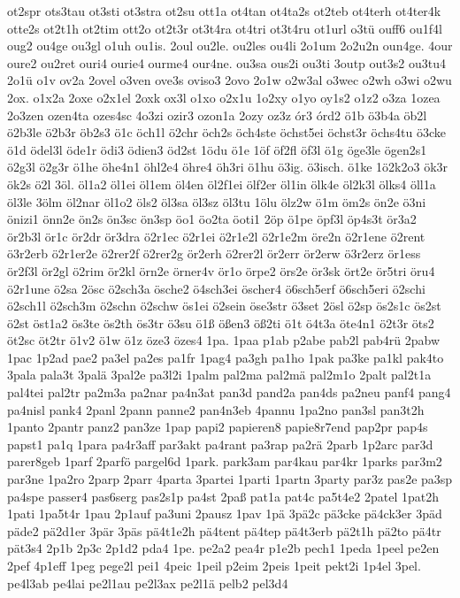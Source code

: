 {ot2spr
ots3tau
ot3sti
ot3stra
ot2su
ott1a
ot4tan
ot4ta2s
ot2teb
ot4terh
ot4ter4k
otte2s
ot2t1h
ot2tim
ott2o
ot2t3r
ot3t4ra
ot4tri
ot3t4ru
ot1url
o3tü
ouff6
ou1f4l
oug2
ou4ge
ou3gl
o1uh
ou1is.
2oul
ou2le.
ou2les
ou4li
2o1um
2o2u2n
oun4ge.
4our
oure2
ou2ret
ouri4
ourie4
ourme4
our4ne.
ou3sa
ous2i
ou3ti
3outp
out3s2
ou3tu4
2o1ü
o1v
ov2a
2ovel
o3ven
ove3s
oviso3
2ovo
2o1w
o2w3al
o3wec
o2wh
o3wi
o2wu
2ox.
o1x2a
2oxe
o2x1el
2oxk
ox3l
o1xo
o2x1u
1o2xy
o1yo
oy1s2
o1z2
o3za
1ozea
2o3zen
ozen4ta
ozes4sc
4o3zi
ozir3
ozon1a
2ozy
oz3z
ór3
órd2
ö1b
ö3b4a
öb2l
ö2b3le
ö2b3r
öb2s3
ö1c
öch1l
ö2chr
öch2s
öch4ste
öchst5ei
öchst3r
öchs4tu
ö3cke
ö1d
ödel3l
öde1r
ödi3
ödien3
öd2st
1ödu
ö1e
1öf
öf2fl
öf3l
ö1g
öge3le
ögen2s1
ö2g3l
ö2g3r
ö1he
öhe4n1
öhl2e4
öhre4
öh3ri
ö1hu
ö3ig.
ö3isch.
ö1ke
1ö2k2o3
ök3r
ök2s
ö2l
3öl.
öl1a2
öl1ei
öl1em
öl4en
öl2f1ei
ölf2er
öl1in
ölk4e
öl2k3l
ölks4
öll1a
öl3le
3ölm
öl2nar
öl1o2
öls2
öl3sa
öl3sz
öl3tu
1ölu
ölz2w
ö1m
öm2s
ön2e
ö3ni
önizi1
önn2e
ön2s
ön3sc
ön3sp
öo1
öo2ta
öoti1
2öp
ö1pe
öpf3l
öp4s3t
ör3a2
ör2b3l
ör1c
ör2dr
ör3dra
ö2r1ec
ö2r1ei
ö2r1e2l
ö2r1e2m
öre2n
ö2r1ene
ö2rent
ö3r2erb
ö2r1er2e
ö2rer2f
ö2rer2g
ör2erh
ö2rer2l
ör2err
ör2erw
ö3r2erz
ör1ess
ör2f3l
ör2gl
ö2rim
ör2kl
örn2e
örner4v
ör1o
örpe2
örs2e
ör3sk
ört2e
ör5tri
öru4
ö2r1une
ö2sa
2ösc
ö2sch3a
ösche2
ö4sch3ei
öscher4
ö6sch5erf
ö6sch5eri
ö2schi
ö2sch1l
ö2sch3m
ö2schn
ö2schw
ös1ei
ö2sein
öse3str
ö3set
2ösl
ö2sp
ös2s1c
ös2st
ö2st
öst1a2
ös3te
ös2th
ös3tr
ö3su
ö1ß
ößen3
öß2ti
ö1t
ö4t3a
öte4n1
ö2t3r
öts2
öt2sc
öt2tr
ö1v2
ö1w
ö1z
öze3
özes4
1pa.
1paa
p1ab
p2abe
pab2l
pab4rü
2pabw
1pac
1p2ad
pae2
pa3el
pa2es
pa1fr
1pag4
pa3gh
pa1ho
1pak
pa3ke
pa1kl
pak4to
3pala
pala3t
3palä
3pal2e
pa3l2i
1palm
pal2ma
pal2mä
pal2m1o
2palt
pal2t1a
pal4tei
pal2tr
pa2m3a
pa2nar
pa4n3at
pan3d
pand2a
pan4ds
pa2neu
panf4
pang4
pa4nisl
pank4
2panl
2pann
panne2
pan4n3eb
4pannu
1pa2no
pan3sl
pan3t2h
1panto
2pantr
panz2
pan3ze
1pap
papi2
papieren8
papie8r7end
pap2pr
pap4s
papst1
pa1q
1para
pa4r3aff
par3akt
pa4rant
pa3rap
pa2rä
2parb
1p2arc
par3d
parer8geb
1parf
2parfö
pargel6d
1park.
park3am
par4kau
par4kr
1parks
par3m2
par3ne
1pa2ro
2parp
2parr
4parta
3partei
1parti
1partn
3party
par3z
pas2e
pa3sp
pa4spe
passer4
pas6serg
pas2s1p
pa4st
2paß
pat1a
pat4c
pa5t4e2
2patel
1pat2h
1pati
1pa5t4r
1pau
2p1auf
pa3uni
2pausz
1pav
1pä
3pä2c
pä3cke
pä4ck3er
3päd
päde2
pä2d1er
3pär
3päs
pä4t1e2h
pä4tent
pä4tep
pä4t3erb
pä2t1h
pä2to
pä4tr
pät3s4
2p1b
2p3c
2p1d2
pda4
1pe.
pe2a2
pea4r
p1e2b
pech1
1peda
1peel
pe2en
2pef
4p1eff
1peg
pege2l
pei1
4peic
1peil
p2eim
2peis
1peit
pekt2i
1p4el
3pel.
pe4l3ab
pe4lai
pe2l1au
pe2l3ax
pe2l1ä
pelb2
pel3d4
}
